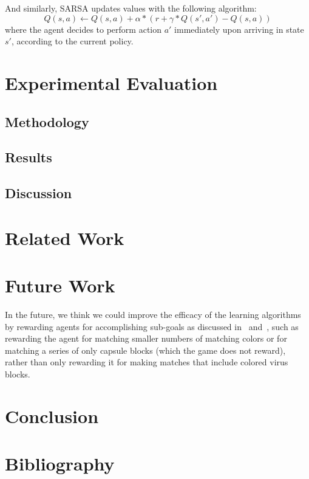 \documentclass[letterpaper]{article} %
\begin{document}
And similarly, SARSA updates values with the following algorithm:
\begin{equation}
Q(s, a) \leftarrow Q(s, a) + \alpha * (r + \gamma * Q(s', a') - Q(s, a))
\end{equation}
where the agent decides to perform action \(a'\) immediately upon arriving in state \(s'\), according to the current policy.

\section{Experimental Evaluation}
\subsection{Methodology}


\subsection{Results}


\subsection{Discussion}

\section{Related Work}

\section{Future Work}
In the future, we think we could improve the efficacy of the learning algorithms by rewarding agents for accomplishing sub-goals as discussed in~\cite{banzas15} and~\cite{bhonker17}, such as rewarding the agent for matching smaller numbers of matching colors or for matching a series of only capsule blocks (which the game does not reward), rather than only rewarding it for making matches that include colored virus blocks.

\section{Conclusion}

\newpage
\section{Bibliography}


\end{document}
